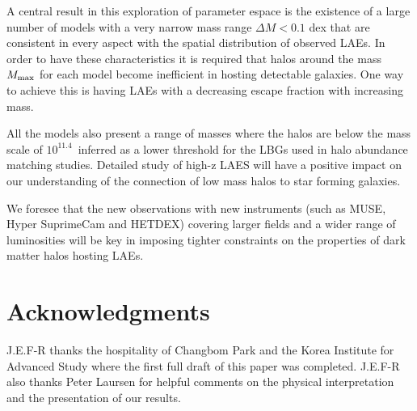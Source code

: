 \documentclass[usenatbib]{mn2e}
\newcommand{\ly}{{\ifmmode{{\rm Ly}\alpha}\else{Ly$\alpha$~}\fi}}
\newcommand{\hMsun}{{\ifmmode{h^{-1}{\rm
        {M_{\odot}}}}\else{$h^{-1}{\rm{M_{\odot}}}$}\fi}}
\begin{document}
A central result in this exploration of parameter espace is the
existence of a large number of models with a very
narrow mass range $\Delta M< 0.1$ dex that are consistent in every
aspect with the spatial distribution of observed LAEs. In order to
have these characteristics it is required that halos around the mass
$M_{\rm max}$ for each model become inefficient in hosting detectable
galaxies. One way to achieve this is having LAEs with a decreasing \ly
escape fraction with increasing mass. 

All the models also present a range of masses where the halos are
below the mass scale of $10^{11.4}$\hMsun \  inferred as a lower
threshold for the LBGs used in halo abundance matching
studies. Detailed study of high-z LAES will have a positive impact on
our understanding of the connection of low mass halos to star forming
galaxies.

We foresee that the new observations with new instruments (such as MUSE,
Hyper SuprimeCam and HETDEX) covering larger fields and a wider range
of luminosities will be key in imposing tighter constraints on the
properties of dark matter halos hosting LAEs.  


\section*{Acknowledgments} 
J.E.F-R thanks the hospitality of Changbom Park and the Korea
Institute for Advanced Study where the first full draft of this paper
was completed. J.E.F-R also thanks Peter Laursen for helpful comments
on the physical interpretation and the presentation of our results.
\end{document}
